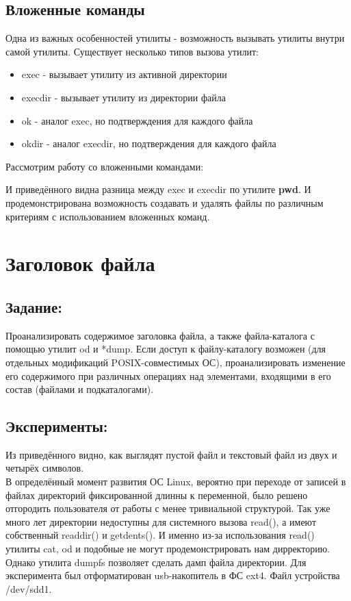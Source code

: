 \documentclass[a4paper]{article}
\begin{document}
\subsection{Вложенные команды}
Одна из важных особенностей утилиты - возможность вызывать утилиты внутри самой утилиты. Существует несколько типов вызова утилит:
\begin{itemize}
\item exec - вызывает утилиту из активной директории
\item execdir - вызывает утилиту из директории файла
\item ok - аналог exec, но подтверждения для каждого файла
\item okdir - аналог execdir, но подтверждения для каждого файла
\end{itemize}
Рассмотрим работу со вложенными командами:

И приведённого видна разница между exec и execdir по утилите \textbf{pwd}. И продемонстрирована возможность создавать и удалять файлы по различным критериям с использованием вложенных команд.
\section{Заголовок файла} \subsection{Задание:}Проанализировать содержимое заголовка файла, а также файла-каталога с помощью утилит od  и  *dump. 
Если доступ к файлу-каталогу возможен (для отдельных модификаций POSIX-совместимых ОС), проанализировать изменение его содержимого при различных операциях над элементами, входящими в его состав (файлами и подкаталогами).  
\subsection{Эксперименты:}

Из приведённого видно, как выглядят пустой файл и текстовый файл из двух и четырёх символов.\\

В определённый момент развития ОС Linux, вероятно при переходе от записей в файлах директорий фиксированной длинны к переменной, было решено отгородить пользователя от работы с менее тривиальной структурой. Так уже много лет директории недоступны для системного вызова read(), а имеют собственный readdir() и getdents(). И именно из-за использования read() утилиты cat, od и подобные не могут продемонстрировать нам дирректорию. Однако утилита dumpfs позволяет сделать дамп файла директории. Для эксперимента был отформатирован usb-накопитель в ФС ext4. Файл устройства /dev/sdd1.\\
\end{document}
